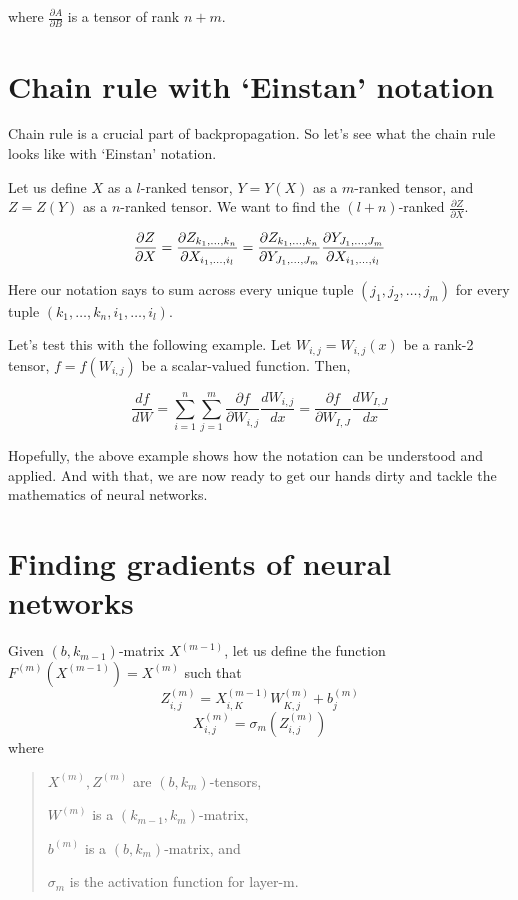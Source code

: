 \documentclass{article}
\begin{document}
where \(\frac{\partial A}{\partial B}\) is a tensor of rank \(n + m\).

\section{Chain rule with `Einstan' notation}

Chain rule is a crucial part of backpropagation. So let's see what the chain rule looks like with `Einstan' notation.

Let us define \(X\) as a \(l\)-ranked tensor, \(Y = Y(X)\) as a \(m\)-ranked tensor, and \(Z = Z(Y)\) as a \(n\)-ranked tensor. We want to find the \((l + n)\)-ranked \(\frac{\partial Z}{\partial X}\).

\[\frac{\partial Z}{\partial X} 
= \frac{\partial Z_{k_1, \dots, k_n}}{\partial X_{i_1, \dots, i_l}} \\
= \frac{\partial Z_{k_1, \dots, k_n}}{\partial Y_{J_1, \dots, J_m}}
\frac{\partial Y_{J_1, \dots, J_m}}{\partial X_{i_1, \dots, i_l}}
\]

Here our notation says to sum across every unique tuple \((j_1, j_2, \dots, j_m)\) for every tuple \((k_1, \dots, k_n, i_1, \dots, i_l)\). 

Let's test this with the following example. Let \(W_{i,j} = W_{i, j}(x)\) be a rank-2 tensor, \(f = f(W_{i, j})\) be a scalar-valued function. Then,

\[ \frac{df}{dW} = \sum_{i=1}^n \sum_{j=1}^m \frac{\partial f}{\partial W_{i, j}} \frac{dW_{i, j}}{dx}
= \frac{\partial f}{\partial W_{I, J}} \frac{dW_{I, J}}{dx} 
\]

Hopefully, the above example shows how the notation can be understood and applied. And with that, we are now ready to get our hands dirty and tackle the mathematics of neural networks.

\section{Finding gradients of neural networks}

Given \((b, k_{m-1})\)-matrix \(X^{(m-1)}\), let us define the function \(F^{(m)}(X^{(m-1)}) = X^{(m)}\)  such that
    \[Z^{(m)}_{i, j} = X^{(m-1)}_{i, K} W^{(m)}_{K, j} + b^{(m)}_j\]
    \[X^{(m)}_{i, j} = \sigma_m(Z^{(m)}_{i, j})\]
where \begin{quote}
    \(X^{(m)}, Z^{(m)}\) are \((b, k_m)\)-tensors,

    \(W^{(m)}\) is a \((k_{m-1}, k_m)\)-matrix,
    
    \(b^{(m)}\) is a \((b, k_m)\)-matrix, and
    
    \(\sigma_m\) is the activation function for layer-m.
\end{quote}
\end{document}
